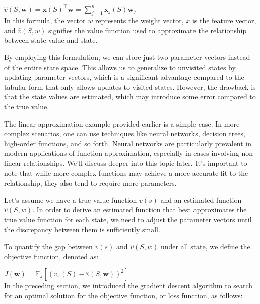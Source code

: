 \documentclass{article}
\begin{document}
\hspace*{\fill}

$\hat{v}(S, \mathbf{w})=\mathbf{x}(S)^{\top} \mathbf{w}=\sum_{j=1}^n \mathbf{x}_j(S) \mathbf{w}_j$ \\

In this formula, the vector $w$ represents the weight vector, $x$ is the feature vector, and $\hat{v}(S,w)$ signifies the value function used to approximate the relationship between state value and state.

By employing this formulation, we can store just two parameter vectors instead of the entire state space. This allows us to generalize to unvisited states by updating parameter vectors, which is a significant advantage compared to the tabular form that only allows updates to visited states. However, the drawback is that the state values are estimated, which may introduce some error compared to the true value.

The linear approximation example provided earlier is a simple case. In more complex scenarios, one can use techniques like neural networks, decision trees, high-order functions, and so forth. Neural networks are particularly prevalent in modern applications of function approximation, especially in cases involving non-linear relationships. We'll discuss deeper into this topic later. It's important to note that while more complex functions may achieve a more accurate fit to the relationship, they also tend to require more parameters.

Let's assume we have a true value function $v(s)$ and an estimated function $\hat{v}(S,w)$. In order to derive an estimated function that best approximates the true value function for each state, we need to adjust the parameter vectors until the discrepancy between them is sufficiently small.

To quantify the gap between  $v(s)$  and $\hat{v}(S,w)$ under all state, we define the objective function, denoted as:

\hspace*{\fill}

$J(\mathbf{w})=\mathbb{E}_\pi\left[\left(v_\pi(S)-\hat{v}(S, \mathbf{w})\right)^2\right]$\\


In the preceding section, we introduced the gradient descent algorithm to search for an optimal solution for the objective function, or loss function, as follows:

\hspace*{\fill}
\end{document}
